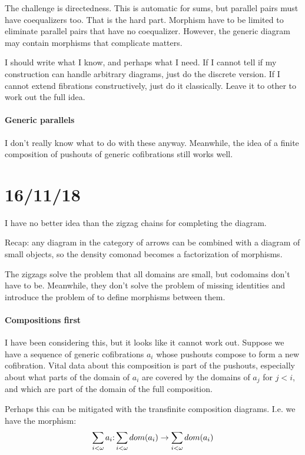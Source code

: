 \documentclass[csh.tex]{subfiles}
\begin{document}
The challenge is directedness. This is automatic for sums, but parallel pairs must have coequalizers too. That is the hard part. Morphism have to be limited to eliminate parallel pairs that have no coequalizer. However, the generic diagram may contain morphisms that complicate matters.

I should write what I know, and perhaps what I need. If I cannot tell if my construction can handle arbitrary diagrams, just do the discrete version. If I cannot extend fibrations constructively, just do it classically. Leave it to other to work out the full idea.

\paragraph{Generic parallels}
I don't really know what to do with these anyway. Meanwhile, the idea of a finite composition of pushouts of generic cofibrations still works well.

\section{16/11/18}
I have no better idea than the zigzag chains for completing the diagram.

Recap: any diagram in the category of arrows can be combined with a diagram of small objects, so the density comonad becomes a factorization of morphisms.

The zigzags solve the problem that all domains are small, but codomains don't have to be. Meanwhile, they don't solve the problem of missing identities and introduce the problem of to define morphisms between them.

\paragraph{Compositions first}
I have been considering this, but it looks like it cannot work out. Suppose we have a sequence of generic cofibrations $a_i$ whose pushouts compose to form a new cofibration. Vital data about this composition is part of the pushouts, especially about what parts of the domain of $a_i$ are covered by the domains of $a_j$ for $j<i$, and which are part of the domain of the full composition.


Perhaps this can be mitigated with the transfinite composition diagrams.
I.e. we have the morphism:
\[\sum_{i<\omega} a_i \mathord : \sum_{i<\omega} dom(a_i)\to \sum_{i<\omega} dom(a_i)\]
\end{document}
